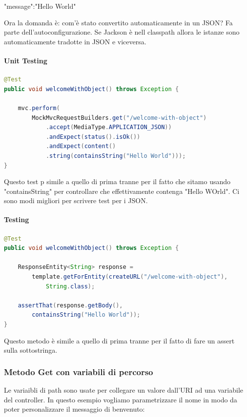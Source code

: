 \documentclass[11pt,a4paper]{book}
\begin{document}
{"message":"Hello World"}

Ora la domanda è: com'è stato convertito automaticamente in un JSON? Fa parte dell'autoconfigurazione. Se Jackson è nell classpath allora le istanze sono automaticamente tradotte in JSON e viceversa.

\paragraph{Unit Testing}
\begin{lstlisting}[language = Java]
@Test
public void welcomeWithObject() throws Exception {
	
	mvc.perform(
		MockMvcRequestBuilders.get("/welcome-with-object")
			.accept(MediaType.APPLICATION_JSON))
			.andExpect(status().isOk())
			.andExpect(content()
			.string(containsString("Hello World")));
}
\end{lstlisting}
Questo test p simile a quello di prima tranne per il fatto che sitamo usando "containsString" per controllare che effettivamente contenga "Hello WOrld". Ci sono modi migliori per scrivere test per i JSON.

\paragraph{Testing}
\begin{lstlisting}[language = Java]
@Test
public void welcomeWithObject() throws Exception {
	
	ResponseEntity<String> response =
		template.getForEntity(createURL("/welcome-with-object"),
			String.class);
	
	assertThat(response.getBody(),
		containsString("Hello World"));
}
\end{lstlisting}

Questo metodo è simile a quello di prima tranne per il fatto di fare un assert sulla sottostringa.

\subsubsection{Metodo Get con variabili di percorso}
Le variaibli di path sono usate per collegare un valore dall'URI ad una variabile del controller. In questo esempio vogliamo parametrizzare il nome in modo da poter personalizzare il messaggio di benvenuto:
\end{document}
